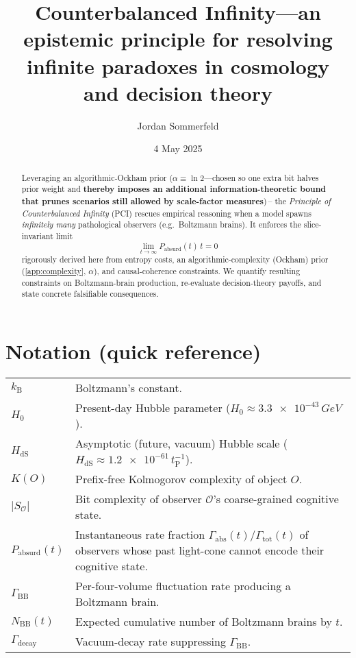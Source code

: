 \documentclass[12pt]{article}
\title{Counterbalanced Infinity---an epistemic principle for resolving infinite paradoxes in cosmology and decision theory}
\author{Jordan Sommerfeld}
\date{4 May 2025}
\newcommand{\KB}{k_\mathrm{B}}
\newcommand{\PCI}{PCI\xspace}
\begin{document}
\raggedbottom
\maketitle

\begin{abstract}\noindent
Leveraging an algorithmic‐Ockham prior
($\alpha\equiv\ln 2$—chosen so one extra bit halves prior weight and \textbf{thereby imposes an additional information-theoretic bound that prunes scenarios still allowed by scale-factor measures})\,– the \emph{Principle of Counterbalanced Infinity} (\PCI) rescues empirical
reasoning when a model spawns \emph{infinitely many} pathological observers (e.g.\ Boltzmann brains). It enforces the slice-invariant limit
\[
   \lim_{t\to\infty} P_{\text{absurd}}(t)\,t = 0
   \tag*{\PCI Limit}\label{eq:PCI-limit}
\]
rigorously derived here from entropy costs, an algorithmic-complexity (Ockham) prior
(\autoref{app:complexity}, $\alpha$), and causal-coherence constraints. We quantify resulting constraints on Boltzmann-brain production,
re-evaluate decision-theory payoffs, and state concrete falsifiable consequences.
\enlargethispage{\baselineskip}
\end{abstract}

\section*{Notation (quick reference)}
\renewcommand{\arraystretch}{1.4}
\begin{tabular}{@{}p{3.3cm}p{10cm}@{}}
$\KB$ & Boltzmann’s constant.\\
$H_0$ & Present-day Hubble parameter ($H_0\!\approx\!\num{3.3e-43}\,\si{GeV}$).\\
$H_{\mathrm{dS}}$ & Asymptotic (future, vacuum) Hubble scale
($H_{\mathrm{dS}}\!\approx\!\num{1.2e-61}\,t_{\mathrm P}^{-1}$).\\
$K(O)$ & Prefix-free Kolmogorov complexity of object $O.$\\
$\lvert S_{\mathcal O}\rvert$ & Bit complexity of observer $\mathcal O$’s coarse-grained cognitive state.\\
$P_{\text{absurd}}(t)$ & Instantaneous rate fraction $\Gamma_{\text{abs}}(t)/\Gamma_{\text{tot}}(t)$ of observers whose past light-cone cannot encode their cognitive state.\\
$\Gamma_{\text{BB}}$ & Per-four-volume fluctuation rate producing a Boltzmann brain.\\
$N_{\text{BB}}(t)$ & Expected cumulative number of Boltzmann brains by $t.$\\
$\Gamma_{\text{decay}}$ & Vacuum-decay rate suppressing $\Gamma_{\text{BB}}.$\\
\end{tabular}
\end{document}
